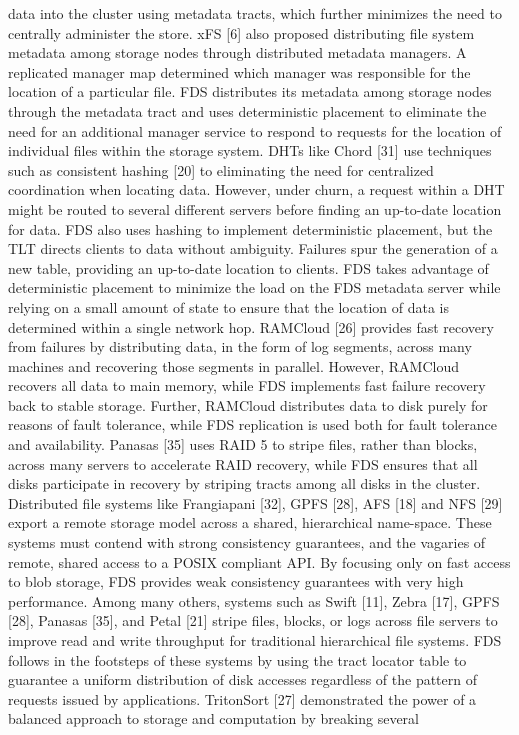 data into the cluster using metadata tracts, which further
minimizes the need to centrally administer the store.
xFS [6] also proposed distributing file system metadata among storage nodes through distributed metadata
managers. A replicated manager map determined which
manager was responsible for the location of a particular
file. FDS distributes its metadata among storage nodes
through the metadata tract and uses deterministic placement to eliminate the need for an additional manager service to respond to requests for the location of individual
files within the storage system.
DHTs like Chord [31] use techniques such as consistent hashing [20] to eliminating the need for centralized
coordination when locating data. However, under churn,
a request within a DHT might be routed to several different servers before finding an up-to-date location for data.
FDS also uses hashing to implement deterministic placement, but the TLT directs clients to data without ambiguity. Failures spur the generation of a new table, providing
an up-to-date location to clients. FDS takes advantage of
deterministic placement to minimize the load on the FDS
metadata server while relying on a small amount of state
to ensure that the location of data is determined within a
single network hop.
RAMCloud [26] provides fast recovery from failures
by distributing data, in the form of log segments, across
many machines and recovering those segments in parallel. However, RAMCloud recovers all data to main memory, while FDS implements fast failure recovery back
to stable storage. Further, RAMCloud distributes data
to disk purely for reasons of fault tolerance, while FDS
replication is used both for fault tolerance and availability. Panasas [35] uses RAID 5 to stripe files, rather than
blocks, across many servers to accelerate RAID recovery, while FDS ensures that all disks participate in recovery by striping tracts among all disks in the cluster.
Distributed file systems like Frangiapani [32],
GPFS [28], AFS [18] and NFS [29] export a remote
storage model across a shared, hierarchical name-space.
These systems must contend with strong consistency
guarantees, and the vagaries of remote, shared access to
a POSIX compliant API. By focusing only on fast access
to blob storage, FDS provides weak consistency guarantees with very high performance.
Among many others, systems such as Swift [11], Zebra [17], GPFS [28], Panasas [35], and Petal [21] stripe
files, blocks, or logs across file servers to improve read
and write throughput for traditional hierarchical file systems. FDS follows in the footsteps of these systems by
using the tract locator table to guarantee a uniform distribution of disk accesses regardless of the pattern of requests issued by applications.
TritonSort [27] demonstrated the power of a balanced
approach to storage and computation by breaking several

